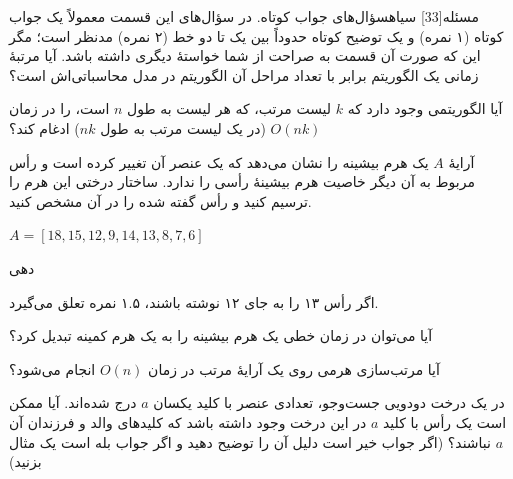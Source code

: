 ‌مسئله[33] ‌سیاه{سؤال‌های جواب کوتاه.} در سؤال‌های این قسمت معمولاً یک جواب کوتاه (۱ نمره) و یک توضیح کوتاه حدوداً بین یک تا دو خط (۲ نمره) مدنظر است؛ مگر این که صورت آن قسمت به صراحت از شما خواستۀ دیگری داشته باشد.
آیا مرتبۀ زمانی یک الگوریتم برابر با تعداد مراحل آن الگوریتم در مدل محاسباتی‌اش است؟

آیا الگوریتمی وجود دارد که $k$ لیست مرتب، که هر لیست به طول $n$ است، را در زمان $O(nk)$ (در یک لیست مرتب به طول $nk$) ادغام کند؟

آرایۀ $A$ یک هرم بیشینه را نشان می‌دهد که یک عنصر آن تغییر کرده است و رأس مربوط به آن دیگر خاصیت هرم بیشینۀ رأسی را ندارد. ساختار درختی این هرم را ترسیم کنید و رأس گفته شده را در آن مشخص کنید.
\begin{flushleft}$
	A=[18, 15, 12, 9, 14, 13, 8, 7, 6]$
\end{flushleft}

‌دهی{
	اگر رأس ۱۳ را به جای ۱۲ نوشته باشند، ۱.۵ نمره تعلق می‌گیرد.
	
}

آیا می‌توان در زمان خطی یک هرم بیشینه را به یک هرم کمینه تبدیل کرد؟


آیا مرتب‌سازی هرمی روی یک آرایۀ مرتب در زمان $O(n)$ انجام می‌شود؟


در یک درخت دودویی جست‌وجو، تعدادی عنصر با کلید یکسان $a$ درج شده‌اند. آیا ممکن است یک رأس با کلید $a$ در این درخت وجود داشته باشد که کلید‌های والد و فرزندان آن $a$ نباشند؟ (اگر جواب خیر است دلیل آن را توضیح دهید و اگر جواب بله است یک مثال بزنید)

